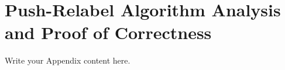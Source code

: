 
\chapter{Push-Relabel Algorithm Analysis and Proof of Correctness} %

\label{AppendixB} %

Write your Appendix content here.